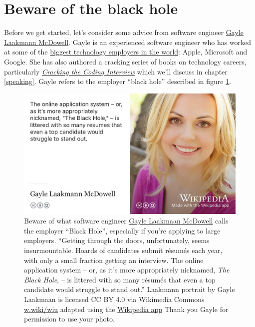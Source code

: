 \documentclass[
]{book}
\begin{document}
\hypertarget{blackhole}{%
\section{Beware of the black hole}\label{blackhole}}

Before we get started, let's consider some advice from software engineer \href{https://en.wikipedia.org/wiki/Gayle_Laakmann_McDowell}{Gayle Laakmann McDowell}. Gayle is an experienced software engineer who has worked at some of the \href{https://en.wikipedia.org/wiki/Big_Tech}{biggest technology employers in the world}: Apple, Microsoft and Google. She has also authored a cracking series of books on technology careers, particularly \emph{\href{https://en.wikipedia.org/wiki/Cracking_the_Coding_Interview}{Cracking the Coding Interview}} \citep{cracking} which we'll discuss in chapter \ref{speaking}. Gayle refers to the employer ``black hole'' described in figure \ref{fig:gayle-fig}.

\begin{figure}

{\centering \includegraphics[width=0.99\linewidth]{images/gayle-black-hole} 

}

\caption{Beware of what software engineer \href{https://en.wikipedia.org/wiki/Gayle_Laakmann_McDowell}{Gayle Laakmaan McDowell} calls the employer ``Black Hole'', especially if you're applying to large employers. ``Getting through the doors, unfortunately, seems insurmountable. Hoards of candidates submit résumés each year, with only a small fraction getting an interview. The online application system -- or, as it's more appropriately nicknamed, \emph{The Black Hole}, -- is littered with so many résumés that even a top candidate would struggle to stand out.'' \citep{blackhole, techcareer} Laakmann portrait by Gayle Laakmaan is licensed CC BY 4.0 via Wikimedia Commons \href{https://w.wiki/wiu}{w.wiki/wiu} adapted using the \href{https://apps.apple.com/us/app/wikipedia/id324715238}{Wikipedia app} Thank you Gayle for permission to use your photo.}\label{fig:gayle-fig}
\end{figure}
\end{document}
